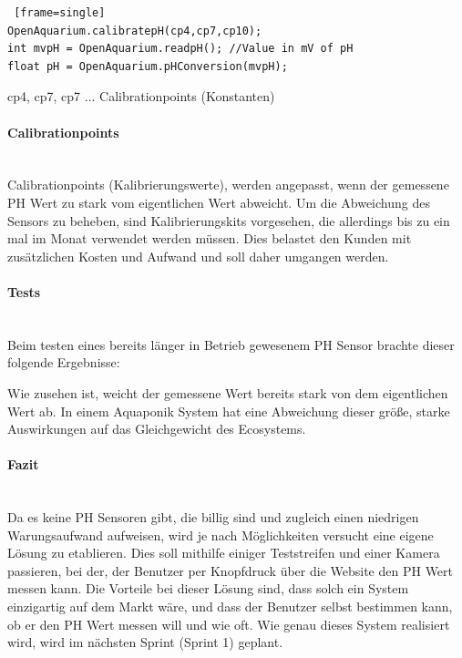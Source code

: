 \documentclass[11pt]{article}
\begin{document}
\begin{lstlisting} [frame=single]
OpenAquarium.calibratepH(cp4,cp7,cp10);
int mvpH = OpenAquarium.readpH(); //Value in mV of pH
float pH = OpenAquarium.pHConversion(mvpH);
\end{lstlisting}
cp4, cp7, cp7 ... Calibrationpoints (Konstanten)

\paragraph{Calibrationpoints} \mbox{} \\
Calibrationpoints (Kalibrierungswerte), werden angepasst, wenn der gemessene PH Wert zu stark vom eigentlichen Wert abweicht. Um die Abweichung des Sensors zu beheben, sind Kalibrierungskits vorgesehen, die allerdings bis zu ein mal im Monat verwendet werden m\"ussen. Dies belastet den Kunden mit zus\"atzlichen Kosten und Aufwand und soll daher umgangen werden.
\paragraph{Tests} \mbox{} \\
Beim testen eines bereits l\"anger in Betrieb gewesenem PH Sensor brachte dieser folgende Ergebnisse: \\
\begin{minipage}{5in}
  \centering
\end{minipage}
Wie zusehen ist, weicht der gemessene Wert bereits stark von dem eigentlichen Wert ab. In einem Aquaponik System hat eine Abweichung dieser gr\"o{\ss}e, starke Auswirkungen auf das Gleichgewicht des Ecosystems. \\
\paragraph{Fazit} \mbox{} \\
Da es keine PH Sensoren gibt, die billig sind und zugleich einen niedrigen Warungsaufwand aufweisen, wird je nach M\"oglichkeiten versucht eine eigene L\"osung zu etablieren. Dies soll mithilfe einiger Teststreifen und einer Kamera passieren, bei der, der Benutzer per Knopfdruck \"uber die Website den PH Wert messen kann. Die Vorteile bei dieser L\"osung sind, dass solch ein System einzigartig auf dem Markt w\"are, und dass der Benutzer selbst bestimmen kann, ob er den PH Wert messen will und wie oft. Wie genau dieses System realisiert wird, wird im n\"achsten Sprint (Sprint 1) geplant.
\end{document}
